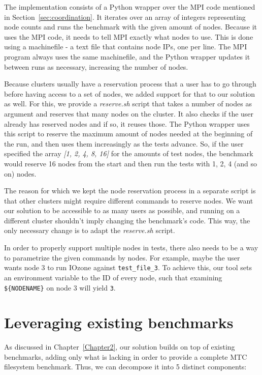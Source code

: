 The implementation consists of a Python wrapper over the MPI code mentioned in Section~\ref{sec:coordination}. It iterates over an array of integers representing node counts and runs the benchmark with the given amount of nodes. Because it uses the MPI code, it needs to tell MPI exactly what nodes to use. This is done using a machinefile - a text file that contains node IPs, one per line. The MPI program always uses the same machinefile, and the Python wrapper updates it between runs as necessary, increasing the number of nodes.

Because clusters usually have a reservation process that a user has to go through before having access to a set of nodes, we added support for that to our solution as well. For this, we provide a \textit{reserve.sh} script that takes a number of nodes as argument and reserves that many nodes on the cluster. It also checks if the user already has reserved nodes and if so, it reuses those. The Python wrapper uses this script to reserve the maximum amount of nodes needed at the beginning of the run, and then uses them increasingly as the tests advance. So, if the user specified the array \textit{[1, 2, 4, 8, 16]} for the amounts of test nodes, the benchmark would reserve 16 nodes from the start and then run the tests with 1, 2, 4 (and so on) nodes.

The reason for which we kept the node reservation process in a separate script is that other clusters might require different commands to reserve nodes. We want our solution to be accessible to as many users as possible, and running on a different cluster shouldn't imply changing the benchmark's code. This way, the only necessary change is to adapt the \textit{reserve.sh} script.

In order to properly support multiple nodes in tests, there also needs to be a way to parametrize the given commands by nodes. For example, maybe the user wants node 3 to run IOzone against \texttt{test\_file\_3}. To achieve this, our tool sets an environment variable to the ID of every node, such that examining \texttt{\$\{NODENAME\}} on node 3 will yield \texttt{3}.


\section{Leveraging existing benchmarks}

As discussed in Chapter~\ref{Chapter2}, our solution builds on top of existing benchmarks, adding only what is lacking in order to provide a complete MTC filesystem benchmark. Thus, we can decompose it into 5 distinct components:


